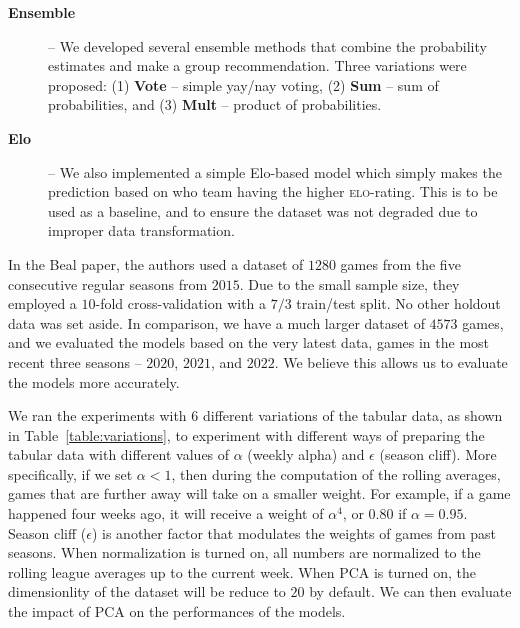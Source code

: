 \documentclass[10pt]{article}
\begin{document}
\begin{description}
\item[\bf Ensemble] -- We developed several ensemble methods that combine the
probability estimates and make a group recommendation. Three variations were proposed:
(1) {\bf Vote} -- simple yay/nay voting,
(2) {\bf Sum} -- sum of probabilities, and (3) {\bf Mult} -- product of probabilities.

\item[\bf Elo] -- We also implemented a simple Elo-based model which simply
makes the prediction based on who team having the higher \textsc{elo}-rating.
This is to be used as a
baseline, and to ensure the dataset was not degraded due to improper data transformation.

\end{description}

In the Beal paper, the authors used a dataset of 
$1280$ games from the five consecutive regular seasons from $2015$. Due to the small
sample size, they employed a $10$-fold cross-validation with a $7/3$ train/test split. No
other holdout data was set aside. In comparison, we have a much larger dataset of
$4573$ games, and we evaluated the models based on the very latest data, games in
the most recent three seasons -- $2020$, $2021$, and $2022$. We believe this allows us
to evaluate the models more accurately.

We ran the experiments with $6$ different variations of the tabular data, as shown
in Table~\ref{table:variations}, to experiment with different ways of preparing the tabular
data with different values of $\alpha$ (weekly alpha) and $\epsilon$ (season cliff).
More specifically, if we set $\alpha < 1$,
then during the computation of the rolling averages, games that are
further away will take on a smaller weight.
For
example, if a game happened four weeks ago, it will receive a weight of $\alpha^4$, or
$0.80$ if $\alpha = 0.95$. Season cliff ($\epsilon$)
is another factor that modulates the weights of
games from past seasons. When normalization is turned on, all numbers are normalized to the
rolling league averages up to the current week. When PCA is turned on,
the dimensionlity of the dataset will be reduce to $20$ by default. We can then evaluate
the impact of PCA on the performances of the models.
\end{document}

